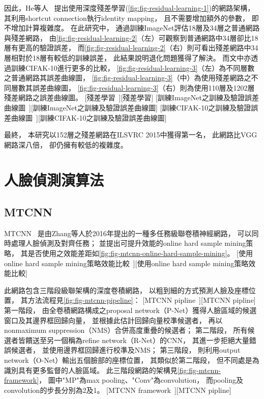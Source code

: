 \documentclass[class=NCU_thesis, crop=false]{standalone}
\begin{document}
因此，He等人~\cite{he_deep_2016}
提出使用深度殘差學習(\cref{fig:fig-residual-learning-1})的網路架構，
其利用shortcut connection執行identity mapping，
且不需要增加額外的參數，
即不增加計算複雜度。
在此研究中，
通過訓練ImageNet評估18層及34層之普通網路與殘差網路，
由\cref{fig:fig-residual-learning-2}（左）可觀察到普通網路中34層卻比18層有更高的驗證誤差，
而\cref{fig:fig-residual-learning-2}（右）則可看出殘差網路中34層相對於18層有較低的訓練誤差，
此結果說明退化問題獲得了解決。
而文中亦透過訓練CIFAK-10進行更多的比較，
\cref{fig:fig-residual-learning-3}（左）為不同層數之普通網路其誤差曲線圖，
\cref{fig:fig-residual-learning-3}（中）為使用殘差網路之不同層數其誤差曲線圖，
\cref{fig:fig-residual-learning-3}（右）則為使用110層及1202層殘差網路之誤差曲線圖。
[殘差學習~\cite{he_deep_2016}][殘差學習]
[訓練ImageNet之訓練及驗證誤差曲線圖~\cite{he_deep_2016}][訓練ImageNet之訓練及驗證誤差曲線圖]
[訓練CIFAK-10之訓練及驗證誤差曲線圖~\cite{he_deep_2016}][訓練CIFAK-10之訓練及驗證誤差曲線圖]

最終，
本研究以152層之殘差網路在ILSVRC 2015中獲得第一名，
此網路比VGG網路深八倍，
卻仍擁有較低的複雜度。

\section{人臉偵測演算法}
\subsection{MTCNN}
MTCNN~\cite{zhang_joint_2016}
是由Zhang等人於2016年提出的一種多任務級聯卷積神經網路，
可以同時處理人臉偵測及對齊任務；
並提出可提升效能的online hard sample mining策略，
其是否使用之效能差距如\cref{fig:fig-mtcnn-online-hard-sample-mining}。
[使用online hard sample mining策略效能比較~\cite{zhang_joint_2016}][使用online hard sample mining策略效能比較]

此網路包含三階段級聯架構的深度卷積網路，
以粗到細的方式預測人臉及座標位置，
其方法流程見\cref{fig:fig-mtcnn-pipeline}：
[MTCNN pipline~\cite{zhang_joint_2016}][MTCNN pipline]
第一階段，
由全卷積網路構成之proposal network（P-Net）獲得人臉區域的候選窗口及其邊界框回歸向量，
並根據此估計回歸向量校準候選者，
再以nonmaximum suppression（NMS）合併高度重疊的候選者；
第二階段，
所有候選者皆饋送至另一個稱為refine network（R-Net）的CNN，
其進一步拒絕大量錯誤候選者，
並使用邊界框回歸進行校準及NMS；
第三階段，
則利用output network（O-Net）輸出五個臉部的座標位置，
其類似於第二階段，
但不同處是為識別具有更多監督的人臉區域。
此三階段網路的架構見\cref{fig:fig-mtcnn-framework}，
圖中"MP"為max pooling、"Conv"為convolution，
而pooling及convolution的步長分別為2及1。
[MTCNN framework~\cite{zhang_joint_2016}][MTCNN pipline]
\end{document}
